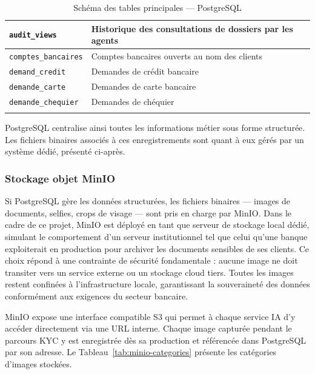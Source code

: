 \begin{longtable}{|p{5cm}|p{9.5cm}|}
  \texttt{audit\_views}                & Historique des consultations de dossiers par les agents \\ \hline
  \texttt{comptes\_bancaires}          & Comptes bancaires ouverts au nom des clients \\ \hline
  \texttt{demand\_credit}              & Demandes de crédit bancaire \\ \hline
  \texttt{demande\_carte}              & Demandes de carte bancaire \\ \hline
  \texttt{demande\_chequier}           & Demandes de chéquier \\ \hline
  \caption{Schéma des tables principales --- PostgreSQL}
  \label{tab:bdd-tables}
\end{longtable}

PostgreSQL centralise ainsi toutes les informations métier sous forme structurée. Les fichiers binaires associés à ces enregistrements sont quant à eux gérés par un système dédié, présenté ci-après.

\subsubsection{Stockage objet MinIO}

Si PostgreSQL gère les données structurées, les fichiers binaires — images de documents, selfies, crops de visage — sont pris en charge par MinIO. Dans le cadre de ce projet, MinIO est déployé en tant que serveur de stockage local dédié, simulant le comportement d'un serveur institutionnel tel que celui qu'une banque exploiterait en production pour archiver les documents sensibles de ses clients. Ce choix répond à une contrainte de sécurité fondamentale : aucune image ne doit transiter vers un service externe ou un stockage cloud tiers. Toutes les images restent confinées à l'infrastructure locale, garantissant la souveraineté des données conformément aux exigences du secteur bancaire.

MinIO expose une interface compatible S3 qui permet à chaque service IA d'y accéder directement via une URL interne. Chaque image capturée pendant le parcours KYC y est enregistrée dès sa production et référencée dans PostgreSQL par son adresse. Le Tableau~\ref{tab:minio-categories} présente les catégories d'images stockées.

